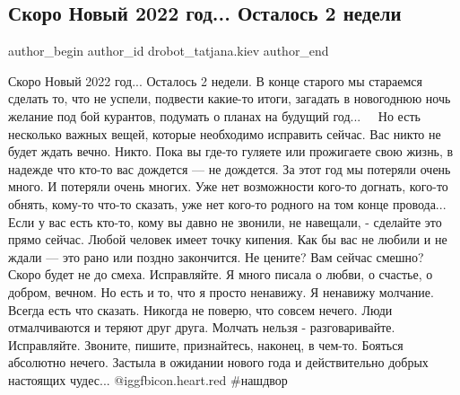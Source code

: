  
 
 
 
 
 
\subsection{Скоро Новый 2022 год... Осталось 2 недели}
\label{sec:15_12_2021.fb.drobot_tatjana.kiev.1.novyj_god_2022}
 
\ifcmt
 author_begin
   author_id drobot_tatjana.kiev
 author_end
\fi


\obeycr
Скоро Новый 2022 год...
Осталось 2 недели.
\smallskip
В конце старого мы стараемся сделать то, что не успели, подвести какие-то
итоги, загадать в новогоднюю ночь желание под бой курантов, подумать о планах
на будущий год... ⠀ Но есть несколько важных вещей, которые необходимо исправить
сейчас.
\smallskip
Вас никто не будет ждать вечно. Никто.
Пока вы где-то гуляете или прожигаете свою жизнь, в надежде что кто-то вас дождется — не дождется.
За этот год мы потеряли очень много.
\smallskip
И потеряли очень многих.
\smallskip
Уже нет возможности кого-то догнать, кого-то обнять, кому-то что-то сказать,
уже нет кого-то родного на том конце провода...
\smallskip
Если у вас есть кто-то, кому вы давно не звонили, не навещали, - сделайте это прямо сейчас.
\smallskip
Любой человек имеет точку кипения.
Как бы вас не любили и не ждали — это рано или поздно закончится.
Не цените? Вам сейчас смешно?
Скоро будет не до смеха. Исправляйте.
\smallskip
Я много писала о любви, о счастье, о добром, вечном.
\smallskip
Но есть и то, что я просто ненавижу.
Я ненавижу молчание.
Всегда есть что сказать.
Никогда не поверю, что совсем нечего.
Люди отмалчиваются и теряют друг друга.
Молчать нельзя - разговаривайте.
Исправляйте.
Звоните, пишите, признайтесь, наконец, в чем-то. 
Бояться абсолютно нечего.
\smallskip
Застыла в ожидании нового года и действительно добрых настоящих чудес... @igg{fbicon.heart.red} \#нашдвор
\restorecr
